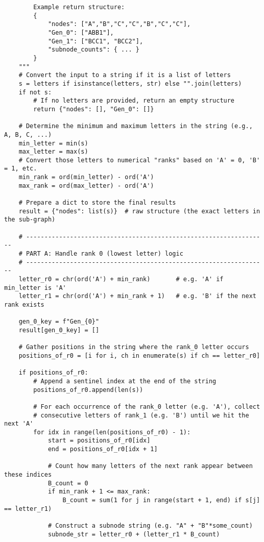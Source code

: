 \begin{lstlisting}
        Example return structure:
        {
            "nodes": ["A","B","C","C","B","C","C"],
            "Gen_0": ["ABB1"],
            "Gen_1": ["BCC1", "BCC2"],
            "subnode_counts": { ... }
        }
    """
    # Convert the input to a string if it is a list of letters
    s = letters if isinstance(letters, str) else "".join(letters)
    if not s:
        # If no letters are provided, return an empty structure
        return {"nodes": [], "Gen_0": []}

    # Determine the minimum and maximum letters in the string (e.g., A, B, C, ...)
    min_letter = min(s)
    max_letter = max(s)
    # Convert those letters to numerical "ranks" based on 'A' = 0, 'B' = 1, etc.
    min_rank = ord(min_letter) - ord('A')
    max_rank = ord(max_letter) - ord('A')

    # Prepare a dict to store the final results
    result = {"nodes": list(s)}  # raw structure (the exact letters in the sub-graph)

    # ------------------------------------------------------------------
    # PART A: Handle rank 0 (lowest letter) logic
    # ------------------------------------------------------------------
    letter_r0 = chr(ord('A') + min_rank)       # e.g. 'A' if min_letter is 'A'
    letter_r1 = chr(ord('A') + min_rank + 1)   # e.g. 'B' if the next rank exists

    gen_0_key = f"Gen_{0}"
    result[gen_0_key] = []

    # Gather positions in the string where the rank_0 letter occurs
    positions_of_r0 = [i for i, ch in enumerate(s) if ch == letter_r0]

    if positions_of_r0:
        # Append a sentinel index at the end of the string
        positions_of_r0.append(len(s))

        # For each occurrence of the rank_0 letter (e.g. 'A'), collect
        # consecutive letters of rank_1 (e.g. 'B') until we hit the next 'A'
        for idx in range(len(positions_of_r0) - 1):
            start = positions_of_r0[idx]
            end = positions_of_r0[idx + 1]

            # Count how many letters of the next rank appear between these indices
            B_count = 0
            if min_rank + 1 <= max_rank:
                B_count = sum(1 for j in range(start + 1, end) if s[j] == letter_r1)

            # Construct a subnode string (e.g. "A" + "B"*some_count)
            subnode_str = letter_r0 + (letter_r1 * B_count)


\end{lstlisting}
